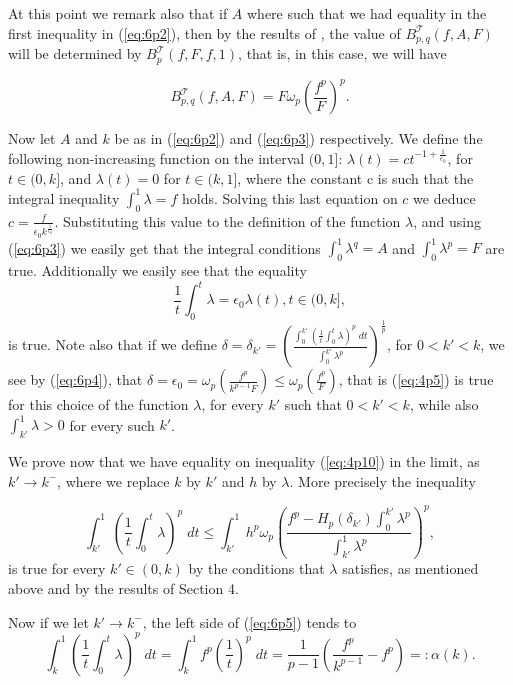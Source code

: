 \documentclass{article}
\numberwithin{equation}{section}
\theoremstyle{definition}
\theoremstyle{remark}
\newcommand{\mc}[1]{\mathcal{#1}}
\begin{document}
At this point we remark also that if $A$ where such that we had equality in the first inequality in (\ref{eq:6p2}), then by the results of \cite{DN}, the value of $B_{p,q}^{\mc T}(f,A,F)$ will be determined by
$B_p^{\mc T}(f,F,f,1)$, that is, in this case, we will have 

$$B_{p,q}^{\mc T}(f,A,F)=F\omega_p(\frac{f^p}{F})^p.$$

Now let $A$ and $k$ be as in (\ref{eq:6p2}) and (\ref{eq:6p3}) respectively. We define the following non-increasing function on the interval $(0,1]$: $\lambda(t)=ct^{-1+\frac{1}{\epsilon_0}}$, for $t\in (0,k]$, and $\lambda(t)=0$ for $t\in (k,1]$, where the constant c is such that the integral inequality $\int_0^1 \lambda=f$ holds. Solving this last equation on $c$ we deduce $c=\frac{f}{\epsilon_0k^{\frac{1}{\epsilon_0}}}$. Substituting this value to the definition of the function $\lambda$, and using (\ref{eq:6p3}) we easily get that the integral conditions $\int_0^1 \lambda^q=A$ and $\int_0^1 \lambda^p=F$ are true. Additionally we easily see that the equality
\begin{equation}\label{eq:6p4}
\frac{1}{t}\int_0^t \lambda=\epsilon_0 \lambda(t), t\in (0,k],
\end{equation}
is true.
Note also that if we define 
$\delta=\delta_{k'}=\left( \frac{\int_0^{k'}\left(\frac{1}{t}\int_0^t \lambda\right)^p\; dt}{\int_0^{k'} \lambda^p} \right)^{\frac{1}{p}}$, for $0<k'<k$,  we see by (\ref{eq:6p4}), that $\delta=\epsilon_0=\omega_p(\frac{f^p}{k^{p-1}F})\leq \omega_p(\frac{f^p}{F})$, that is (\ref{eq:4p5}) is true for this choice of the function $\lambda$, for every $k'$ such that $0<k'<k$, while also $\int_{k'}^1\lambda>0$ for every such $k'$. 

We prove now that we have equality on inequality (\ref{eq:4p10}) in the limit, as $k'\rightarrow k^{-}$, where we replace $k$ by $k'$ and $h$ by $\lambda$. More precisely the inequality

\begin{equation}\label{eq:6p5}
\int_{k'}^1 \left( \frac{1}{t} \int_0^t \lambda \right)^p \;dt \leq \int_{k'}^1 h^p \omega_p \left(\frac{f^p-H_{p}(\delta_{k'}) \int_0^{k'} \lambda^p }{\int_{k'}^1 \lambda^p}\right)^p,
\end{equation} 
is true for every $k'\in (0,k)$ by the conditions that $\lambda$ satisfies, as mentioned above and by the results of Section 4.

Now if we let $k'\rightarrow k^{-}$, the left side of (\ref{eq:6p5}) tends to $$\int_k^1 \left( \frac{1}{t} \int_0^t \lambda \right)^p \;dt=\int_k^1f^p(\frac{1}{t})^p \;dt=\frac{1}{p-1}(\frac{f^p}{k^{p-1}}-f^p)=:\alpha(k).$$
\end{document}
